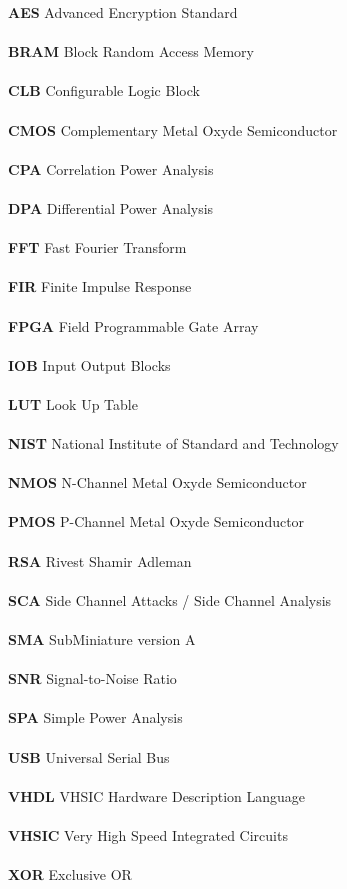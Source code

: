 \documentclass[oneside]{book}
\begin{document}
\vspace{-2.5cm}\hspace{-0.5cm}\textbf{AES} \hfill Advanced Encryption Standard \\ \\
\textbf{BRAM} \hfill Block Random Access Memory \\ \\
\textbf{CLB} \hfill Configurable Logic Block \\ \\
\textbf{CMOS} \hfill Complementary Metal Oxyde Semiconductor \\ \\
\textbf{CPA} \hfill Correlation Power Analysis \\ \\
\textbf{DPA} \hfill Differential Power Analysis \\ \\
\textbf{FFT} \hfill Fast Fourier Transform \\ \\
\textbf{FIR} \hfill Finite Impulse Response \\ \\
\textbf{FPGA} \hfill Field Programmable Gate Array \\ \\
\textbf{IOB} \hfill Input Output Blocks \\ \\
\textbf{LUT} \hfill Look Up Table \\ \\
\textbf{NIST} \hfill National Institute of Standard and Technology \\ \\
\textbf{NMOS} \hfill N-Channel Metal Oxyde Semiconductor \\ \\
\textbf{PMOS} \hfill P-Channel Metal Oxyde Semiconductor \\ \\
\textbf{RSA} \hfill Rivest Shamir Adleman \\ \\
\textbf{SCA} \hfill Side Channel Attacks / Side Channel Analysis \\ \\
\textbf{SMA} \hfill SubMiniature version A \\ \\
\textbf{SNR} \hfill Signal-to-Noise Ratio \\ \\
\textbf{SPA} \hfill Simple Power Analysis \\ \\
\textbf{USB} \hfill Universal Serial Bus \\ \\
\textbf{VHDL} \hfill VHSIC Hardware Description Language \\ \\
\textbf{VHSIC} \hfill Very High Speed Integrated Circuits \\ \\
\textbf{XOR} \hfill Exclusive OR \\ \\
\end{document}
